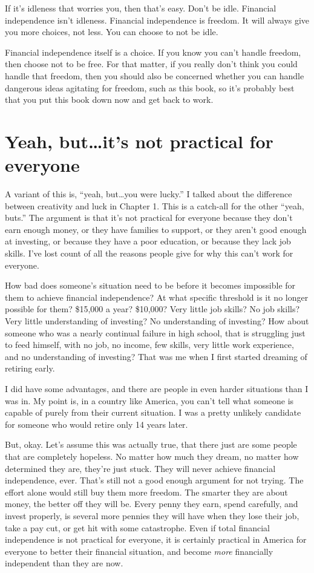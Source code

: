 If it's idleness that worries you, then that's easy. Don't be idle. Financial independence isn't idleness. Financial independence is freedom. It will always give you more choices, not less. You can choose to not be idle.

Financial independence itself is a choice. If you know you can't handle freedom, then choose not to be free. For that matter, if you really don't think you could handle that freedom, then you should also be concerned whether you can handle dangerous ideas agitating for freedom, such as this book, so it's probably best that you put this book down now and get back to work.

\section{Yeah, but\ldots it's not practical for everyone}
A variant of this is, ``yeah, but\ldots you were lucky.'' I talked about the difference between creativity and luck in Chapter 1. This is a catch-all for the other ``yeah, buts.'' The argument is that it's not practical for everyone because they don't earn enough money, or they have families to support, or they aren't good enough at investing, or because they have a poor education, or because they lack job skills. I've lost count of all the reasons people give for why this can't work for everyone.

How bad does someone's situation need to be before it becomes impossible for them to achieve financial independence? At what specific threshold is it no longer possible for them? \$15,000 a year? \$10,000? Very little job skills? No job skills? Very little understanding of investing? No understanding of investing? How about someone who was a nearly continual failure in high school, that is struggling just to feed himself, with no job, no income, few skills, very little work experience, and no understanding of investing? That was me when I first started dreaming of retiring early.

I did have some advantages, and there are people in even harder situations than I was in. My point is, in a country like America, you can't tell what someone is capable of purely from their current situation. I was a pretty unlikely candidate for someone who would retire only 14 years later.

But, okay. Let's assume this was actually true, that there just are some people that are completely hopeless. No matter how much they dream, no matter how determined they are, they're just stuck. They will never achieve financial independence, ever. That's still not a good enough argument for not trying. The effort alone would still buy them more freedom. The smarter they are about money, the better off they will be. Every penny they earn, spend carefully, and invest properly, is several more pennies they will have when they lose their job, take a pay cut, or get hit with some catastrophe. Even if total financial independence is not practical for everyone, it is certainly practical in America for everyone to better their financial situation, and become \emph{more} financially independent than they are now.


